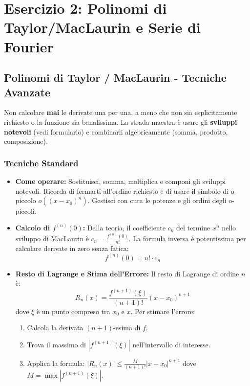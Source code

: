 \section{Esercizio 2: Polinomi di Taylor/MacLaurin e Serie di Fourier}

\subsection{Polinomi di Taylor / MacLaurin - Tecniche Avanzate}
\begin{strategia}
Non calcolare \textbf{mai} le derivate una per una, a meno che non sia esplicitamente richiesto o la funzione sia banalissima. La strada maestra è usare gli \textbf{sviluppi notevoli} (vedi formulario) e combinarli algebricamente (somma, prodotto, composizione).
\end{strategia}

\subsubsection{Tecniche Standard}
\begin{itemize}
    \item \textbf{Come operare:} Sostituisci, somma, moltiplica e componi gli sviluppi notevoli. Ricorda di fermarti all'ordine richiesto e di usare il simbolo di o-piccolo \(o((x-x_0)^n)\). Gestisci con cura le potenze e gli ordini degli o-piccoli.
    \item \textbf{Calcolo di \(f^{(n)}(0)\):} Dalla teoria, il coefficiente \(c_n\) del termine \(x^n\) nello sviluppo di MacLaurin è \(c_n = \frac{f^{(n)}(0)}{n!}\). La formula inversa è potentissima per calcolare derivate in zero senza fatica: 
    \[ f^{(n)}(0) = n! \cdot c_n \]
    \item \textbf{Resto di Lagrange e Stima dell'Errore:} Il resto di Lagrange di ordine \(n\) è:
    \[ R_n(x) = \frac{f^{(n+1)}(\xi)}{(n+1)!}(x-x_0)^{n+1} \]
    dove \(\xi\) è un punto compreso tra \(x_0\) e \(x\). Per stimare l'errore:
    \begin{enumerate}
        \item Calcola la derivata \((n+1)\)-esima di \(f\).
        \item Trova il massimo di \(|f^{(n+1)}(\xi)|\) nell'intervallo di interesse.
        \item Applica la formula: \(|R_n(x)| \le \frac{M}{(n+1)!}|x-x_0|^{n+1}\) dove \(M = \max |f^{(n+1)}(\xi)|\).
    \end{enumerate}
\end{itemize}


